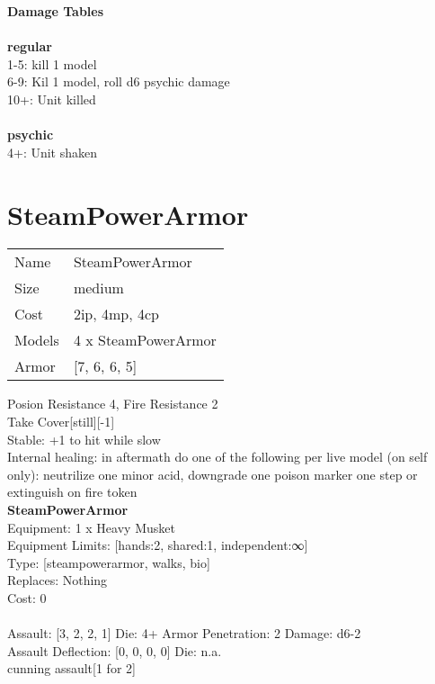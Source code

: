 {\bf Damage Tables} \\
\ \\ {\bf regular } \\
1-5: kill 1 model \\
6-9: Kil 1 model, roll d6 psychic damage \\
10+: Unit killed \\
\ \\ {\bf psychic } \\
4+: Unit shaken \\










\pagebreak\pagebreak

\section{ SteamPowerArmor }

\begin{tabular}{ll}
  Name & SteamPowerArmor \\
  Size & medium\\
  Cost & 2ip, 4mp, 4cp\\
  Models & 4 x SteamPowerArmor\\
  Armor & [7, 6, 6, 5]\\
\end{tabular}

\noindent Posion Resistance 4, Fire Resistance 2\\ 
Take Cover[still][-1]\\ 
Stable: +1 to hit while slow\\ 
Internal healing: in aftermath do one of the following per live model (on self only): neutrilize one minor acid, downgrade one poison marker one step or  extinguish on fire token\\ 


{\bf SteamPowerArmor } \\
Equipment: 1 x Heavy Musket \\
Equipment Limits: [hands:2, shared:1, independent:∞] \\
Type: [steampowerarmor, walks, bio] \\
Replaces: Nothing \\
Cost: 0\\
\ \\
Assault: [3, 2, 2, 1] Die: 4+ Armor Penetration: 2 Damage: d6-2 \\
Assault Deflection: [0, 0, 0, 0] Die: n.a.\\
\indent cunning assault[1 for 2]\\ 
 

